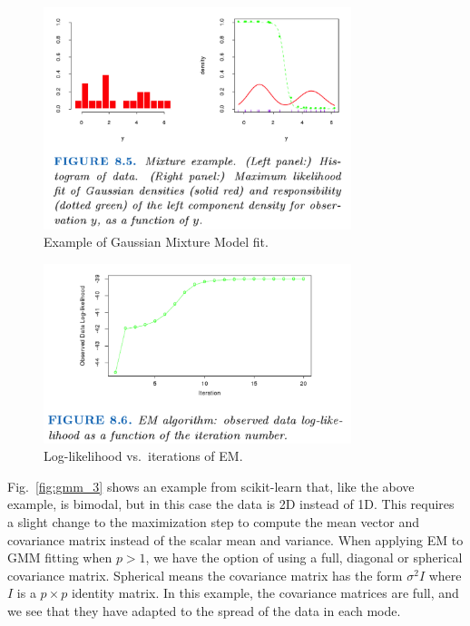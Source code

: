 \documentclass[a4paper]{article}
\begin{document}
\begin{figure}
\centering
\includegraphics[width=0.8\textwidth]{fig8_5.png}
\caption{
	\label{fig:gmm_1}
    Example of Gaussian Mixture Model fit.
}
\end{figure}

\begin{figure}
\centering
\includegraphics[width=0.8\textwidth]{em_alg.png}
\caption{
	\label{fig:gmm_2}
    Log-likelihood vs.\ iterations of EM.
}
\end{figure}

Fig.\ \ref{fig:gmm_3} shows an example from scikit-learn that, like the above example, is bimodal, but in this case the data is 2D instead of 1D.  
This requires a slight change to the maximization step to compute the mean vector and covariance matrix instead of the scalar mean and variance.   
When applying EM to GMM fitting when $p>1$, we have the option of using a full, diagonal or spherical covariance matrix.  
Spherical means the covariance matrix has the form $\sigma^2 I$ where $I$ is a $p\times p$ identity matrix.  
In this example, the covariance matrices are full, and we see that they have adapted to the spread of the data in each mode.
\end{document}
